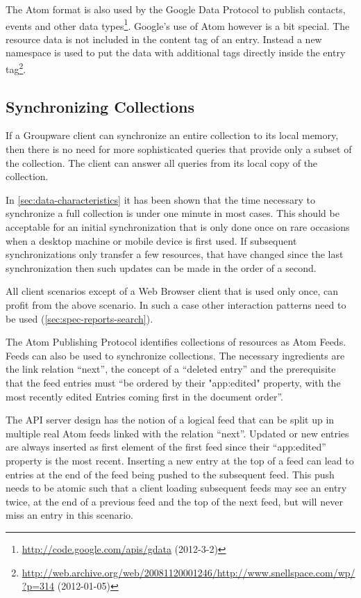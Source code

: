 \documentclass[12pt,a4paper,twoside]{scrartcl}		%
\newcommand{\citeurl}[2]{\url{#1} (#2)}
\begin{document}
The Atom format is also used by the Google Data Protocol to publish contacts,
events and other data
types\footnote{\citeurl{http://code.google.com/apis/gdata}{2012-3-2}}. Google's
use of Atom however is a bit special. The resource data is not included in the
content tag of an entry. Instead a new namespace is used to put the data with
additional tags directly inside the entry
tag\footnote{\citeurl{http://web.archive.org/web/20081120001246/http://www.snellspace.com/wp/?p=314}{2012-01-05}}.


\subsection{Synchronizing Collections}
\label{sec:synchr-coll}

If a Groupware client can synchronize an entire collection to its local memory,
then there is no need for more sophisticated queries that provide only a subset
of the collection. The client can answer all queries from its local copy of the
collection.

In \autoref{sec:data-characteristics} it has been shown that the time necessary
to synchronize a full collection is under one minute in most cases. This should
be acceptable for an initial synchronization that is only done once on rare
occasions when a desktop machine or mobile device is first used. If subsequent
synchronizations only transfer a few resources, that have changed since the last
synchronization then such updates can be made in the order of a second.

All client scenarios except of a Web Browser client that is used only once, can
profit from the above scenario. In such a case other interaction patterns need
to be used (\autoref{sec:spec-reports-search}).

The Atom Publishing Protocol identifies collections of resources as Atom
Feeds. Feeds can also be used to synchronize collections. The necessary
ingredients are the link relation ``next''\cite{RFC5005}, the concept of a
``deleted entry''\cite{draft-snell-atompub-tombstones-14} and the prerequisite
that the feed entries must ``be ordered by their "app:edited" property, with the
most recently edited Entries coming first in the document
order''\cite[sec. 10]{RFC5023}.

The API server design has the notion of a logical feed that can be split up in
multiple real Atom feeds linked with the relation ``next''. Updated or new
entries are always inserted as first element of the first feed since their
``app:edited'' property is the most recent. Inserting a new entry at the top of
a feed can lead to entries at the end of the feed being pushed to the subsequent
feed. This push needs to be atomic such that a client loading subsequent feeds
may see an entry twice, at the end of a previous feed and the top of the next
feed, but will never miss an entry in this scenario.
\end{document}
